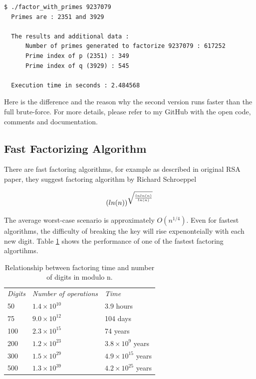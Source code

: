 \documentclass[a4paper, 12pt]{article}
\begin{document}
\begin{lstlisting}[caption=Demonstartion of Prime Factorization with Primes]
  $ ./factor_with_primes 9237079
  Primes are : 2351 and 3929

  The results and additional data :
      Number of primes generated to factorize 9237079 : 617252
      Prime index of p (2351) : 349
      Prime index of q (3929) : 545
      
  Execution time in seconds : 2.484568
  \end{lstlisting}

Here is the difference and the reason why the second version runs faster than the full brute-force.
For more details, please refer to my GitHub with the open code, comments and documentation. 

\subsection{Fast Factorizing Algorithm}
\label{bsec:fast}

There are fast factoring algorithms, for example as described in original RSA paper\cite{rsapaper},
they suggest factoring algorithm by Richard Schroeppel

\begin{equation}
  (ln(n))^{\sqrt{\frac{lnln(n)}{ln(n)}}}\\
  \end{equation}

The average worst-case scenario is approximately $O(n^{1/4})$. Even for fastest algorithms, the difficulty
of breaking the key will rise expenonteially with each new digit. Table \ref{table:rsa} shows the performance of one of the fastest factoring algortihms.

\begin{table}
  \begin{center}
    \begin{tabular}{l l l}
      
  \label{table:rsa}
    \textit{Digits} & \textit{Number of operations} & \textit{Time}\\
    50 & $1.4 \times 10^{10}$ & 3.9 hours\\
    75 & $9.0 \times 10^{12}$ & 104 days\\
    100 & $2.3 \times 10^{15}$ & 74 years\\
    200 & $1.2 \times 10^{23}$ & $3.8 \times 10^9$ years\\
    300 & $1.5 \times 10^{29}$ & $4.9 \times 10^{15}$ years\\
    500 & $1.3 \times 10^{39}$ & $4.2 \times 10^{25}$ years\\
  \end{tabular}
  \caption{Relationship between factoring time and number of digits in modulo n.\cite{rsapaper}}
  \end{center}
  \end{table}
\end{document}
